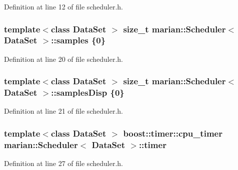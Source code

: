 Definition at line 12 of file scheduler.\+h.

\subsubsection[{\texorpdfstring{samples}{samples}}]{\setlength{\rightskip}{0pt plus 5cm}template$<$class Data\+Set $>$ size\+\_\+t {\bf marian\+::\+Scheduler}$<$ Data\+Set $>$\+::samples \{0\}\hspace{0.3cm}{\ttfamily [private]}}\hypertarget{classmarian_1_1Scheduler_aa04e56213d32a491b15a9abdafe7ee94}{}\label{classmarian_1_1Scheduler_aa04e56213d32a491b15a9abdafe7ee94}


Definition at line 20 of file scheduler.\+h.

\subsubsection[{\texorpdfstring{samples\+Disp}{samplesDisp}}]{\setlength{\rightskip}{0pt plus 5cm}template$<$class Data\+Set $>$ size\+\_\+t {\bf marian\+::\+Scheduler}$<$ Data\+Set $>$\+::samples\+Disp \{0\}\hspace{0.3cm}{\ttfamily [private]}}\hypertarget{classmarian_1_1Scheduler_a766d4b314a640dcdd36405887217d262}{}\label{classmarian_1_1Scheduler_a766d4b314a640dcdd36405887217d262}


Definition at line 21 of file scheduler.\+h.

\subsubsection[{\texorpdfstring{timer}{timer}}]{\setlength{\rightskip}{0pt plus 5cm}template$<$class Data\+Set $>$ boost\+::timer\+::cpu\+\_\+timer {\bf marian\+::\+Scheduler}$<$ Data\+Set $>$\+::timer\hspace{0.3cm}{\ttfamily [private]}}\hypertarget{classmarian_1_1Scheduler_a67aa9ed4773be96d9490ffce8ba663d6}{}\label{classmarian_1_1Scheduler_a67aa9ed4773be96d9490ffce8ba663d6}


Definition at line 27 of file scheduler.\+h.


